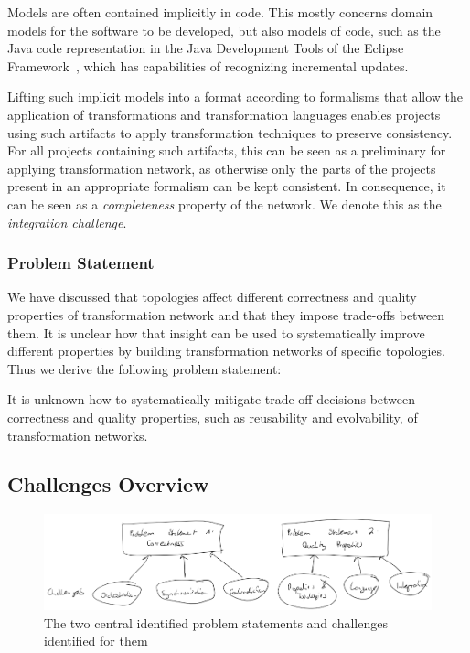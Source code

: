 Models are often contained implicitly in code.
This mostly concerns domain models for the software to be developed, but also models of code, such as the Java code representation in the Java Development Tools of the Eclipse Framework~\cite{EclipseJDT}, which has capabilities of recognizing incremental updates.

Lifting such implicit models into a format according to formalisms that allow the application of transformations and transformation languages enables projects using such artifacts to apply transformation techniques to preserve consistency.
For all projects containing such artifacts, this can be seen as a preliminary for applying transformation network, as otherwise only the parts of the projects present in an appropriate formalism can be kept consistent.
In consequence, it can be seen as a \emph{completeness} property of the network.
We denote this as the \emph{integration challenge}.

\subsubsection*{Problem Statement}

We have discussed that topologies affect different correctness and quality properties of transformation network and that they impose trade-offs between them.
It is unclear how that insight can be used to systematically improve different properties by building transformation networks of specific topologies.
Thus we derive the following problem statement:

\begin{problemstatement}
    It is unknown how to systematically mitigate trade-off decisions between correctness and quality properties, such as reusability and evolvability, of transformation networks.
\end{problemstatement}


\subsection{Challenges Overview}

\begin{figure}
    \centering
    \includegraphics[width=\textwidth]{figures/prologue/introduction/challenges.png}
    \caption[Problem statements and challenges]{The two central identified problem statements and challenges identified for them}
    \label{fig:introduction:challenges}
\end{figure}

